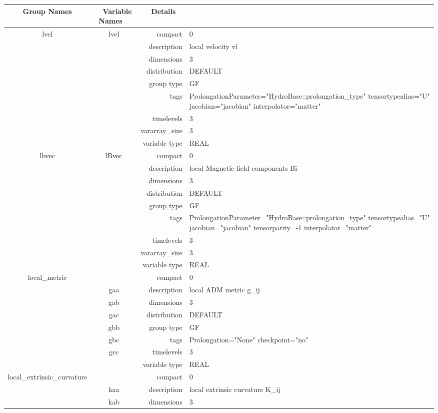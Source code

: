 \documentclass{article}
\begin{document}
\begin{tabular*}{150mm}{|c|c@{\extracolsep{\fill}}|rl|} \hline 
~ {\bf Group Names} ~ & ~ {\bf Variable Names} ~  &{\bf Details} ~ & ~ \\ 
\hline 
lvel & lvel & compact & 0 \\ 
 &  & description & local velocity v\^i \\ 
 &  & dimensions & 3 \\ 
 &  & distribution & DEFAULT \\ 
 &  & group type & GF \\ 
 &  & tags & ProlongationParameter="HydroBase::prolongation\_type" tensortypealias="U" jacobian="jacobian" interpolator="matter" \\ 
 &  & timelevels & 3 \\ 
 &  & vararray\_size & 3 \\ 
 &  & variable type & REAL \\ 
\hline 
lbvec & lBvec & compact & 0 \\ 
 &  & description & local Magnetic field components B\^i \\ 
 &  & dimensions & 3 \\ 
 &  & distribution & DEFAULT \\ 
 &  & group type & GF \\ 
 &  & tags & ProlongationParameter="HydroBase::prolongation\_type" tensortypealias="U" jacobian="jacobian" tensorparity=-1 interpolator="matter" \\ 
 &  & timelevels & 3 \\ 
 &  & vararray\_size & 3 \\ 
 &  & variable type & REAL \\ 
\hline 
local\_metric &  & compact & 0 \\ 
 & gaa & description & local ADM metric g\_ij \\ 
 & gab & dimensions & 3 \\ 
 & gac & distribution & DEFAULT \\ 
 & gbb & group type & GF \\ 
 & gbc & tags & Prolongation="None" checkpoint="no" \\ 
 & gcc & timelevels & 3 \\ 
 &  & variable type & REAL \\ 
\hline 
local\_extrinsic\_curvature &  & compact & 0 \\ 
 & kaa & description & local extrinsic curvature K\_ij \\ 
 & kab & dimensions & 3 \\ 

\end{tabular*}
\end{document}
